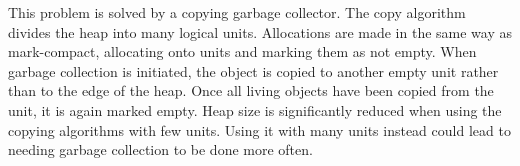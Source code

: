 This problem is solved by a copying garbage collector. The copy algorithm divides the heap into many logical units. Allocations are made in the same way as mark-compact, allocating onto units and marking them as not empty. When garbage collection is initiated, the object is copied to another empty unit rather than to the edge of the heap. Once all living objects have been copied from the unit, it is again marked empty. Heap size is significantly reduced when using the copying algorithms with few units. Using it with many units instead could lead to needing garbage collection to be done more often.

